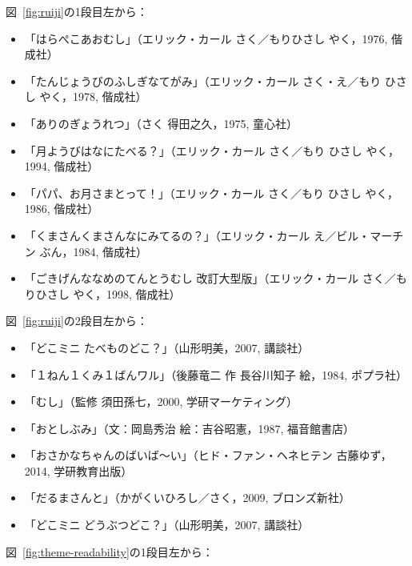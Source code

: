 \documentclass[japanese]{jnlp_1.4}
\begin{document}
図~\ref{fig:ruiji}の1段目左から：\\
\small
\begin{itemize}
\item 「はらぺこあおむし」（エリック・カール さく／もりひさし やく，1976, 偕成社）

\item 「たんじょうびのふしぎなてがみ」（エリック・カール さく・え／もり ひさし やく，1978, 偕成社）

\item 「ありのぎょうれつ」（さく 得田之久，1975, 童心社）

\item 「月ようびはなにたべる？」（エリック・カール さく／もり ひさし やく，1994, 偕成社）

\item 「パパ、お月さまとって！」（エリック・カール さく／もり ひさし やく，1986, 偕成社）


\item 「くまさんくまさんなにみてるの？」（エリック・カール え／ビル・マーチン ぶん，1984, 偕成社）



\item 「ごきげんななめのてんとうむし 改訂大型版」（エリック・カール さく／もりひさし やく，1998, 偕成社）

\end{itemize}

\normalsize
 図~\ref{fig:ruiji}の2段目左から：

\small
\begin{itemize}
\item 「どこミニ たべものどこ？」（山形明美，2007, 講談社）

\item 「１ねん１くみ１ばんワル」（後藤竜二 作 長谷川知子 絵，1984, ポプラ社）

\item 「むし」（監修 須田孫七，2000, 学研マーケティング）

\item 「おとしぶみ」（文：岡島秀治 絵：吉谷昭憲，1987, 福音館書店）

\item 「おさかなちゃんのばいば〜い」（ヒド・ファン・ヘネヒテン 古藤ゆず，2014, 学研教育出版）

\item 「だるまさんと」（かがくいひろし／さく，2009, ブロンズ新社）

\item 「どこミニ どうぶつどこ？」（山形明美，2007, 講談社）

\end{itemize}
\normalsize
 図~\ref{fig:theme-readability}の1段目左から：
\end{document}
